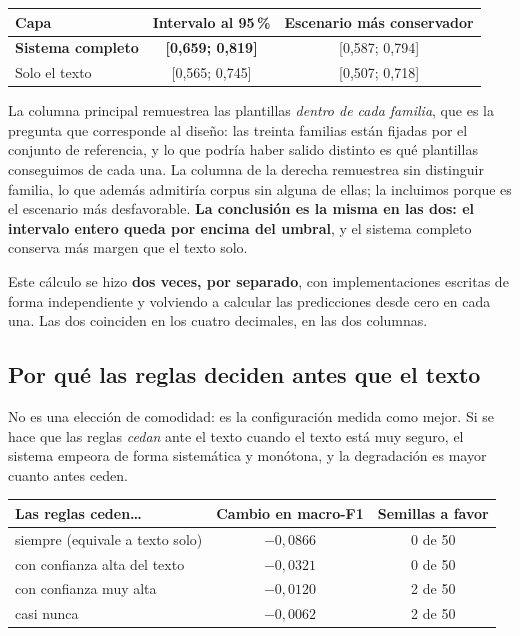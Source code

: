 \documentclass[11pt,a4paper]{article}
\begin{document}
\begin{center}
\small
\begin{tabular}{lcc}
\toprule
\textbf{Capa} & \textbf{Intervalo al 95\,\%} & \textbf{Escenario más conservador} \\
\midrule
\textbf{Sistema completo} & \textbf{[0,659; 0,819]} & [0,587; 0,794] \\
Solo el texto             & [0,565; 0,745] & [0,507; 0,718] \\
\bottomrule
\end{tabular}
\end{center}

La columna principal remuestrea las plantillas \emph{dentro de cada familia}, que es la pregunta que
corresponde al diseño: las treinta familias están fijadas por el conjunto de referencia, y lo que
podría haber salido distinto es qué plantillas conseguimos de cada una. La columna de la derecha
remuestrea sin distinguir familia, lo que además admitiría corpus sin alguna de ellas; la incluimos
porque es el escenario más desfavorable. \textbf{La conclusión es la misma en las dos: el intervalo
entero queda por encima del umbral}, y el sistema completo conserva más margen que el texto solo.

Este cálculo se hizo \textbf{dos veces, por separado}, con implementaciones escritas de forma
independiente y volviendo a calcular las predicciones desde cero en cada una. Las dos coinciden en
los cuatro decimales, en las dos columnas.

\subsection*{Por qué las reglas deciden antes que el texto}

No es una elección de comodidad: es la configuración medida como mejor. Si se hace que las reglas
\emph{cedan} ante el texto cuando el texto está muy seguro, el sistema empeora de forma sistemática
y monótona, y la degradación es mayor cuanto antes ceden.

\begin{center}
\small
\begin{tabular}{lcc}
\toprule
\textbf{Las reglas ceden\ldots} & \textbf{Cambio en macro-F1} & \textbf{Semillas a favor} \\
\midrule
siempre (equivale a texto solo) & $-0,0866$ & 0 de 50 \\
con confianza alta del texto    & $-0,0321$ & 0 de 50 \\
con confianza muy alta          & $-0,0120$ & 2 de 50 \\
casi nunca                      & $-0,0062$ & 2 de 50 \\
\bottomrule
\end{tabular}
\end{center}
\end{document}
